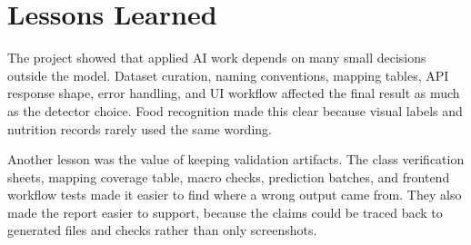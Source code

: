 \section{Lessons Learned}

The project showed that applied AI work depends on many small decisions outside the model. Dataset curation, naming conventions, mapping tables, API response shape, error handling, and UI workflow affected the final result as much as the detector choice. Food recognition made this clear because visual labels and nutrition records rarely used the same wording.

Another lesson was the value of keeping validation artifacts. The class verification sheets, mapping coverage table, macro checks, prediction batches, and frontend workflow tests made it easier to find where a wrong output came from. They also made the report easier to support, because the claims could be traced back to generated files and checks rather than only screenshots.

